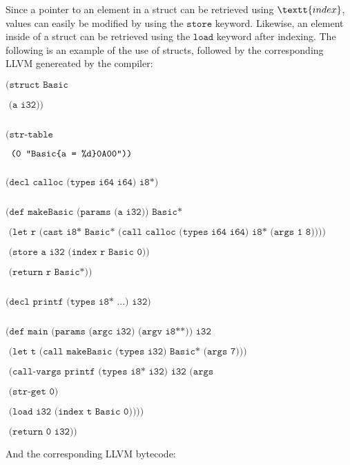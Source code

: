 \documentclass[journal=jacsat, manuscript=article]{achemso}
\begin{document}
Since a pointer to an element in a struct can be retrieved using $\textt{index}$, values can easily be
modified by using the $\texttt{store}$ keyword. Likewise, an element inside of a struct can be retrieved
using the $\texttt{load}$ keyword after indexing. The following is an example of the use of structs, followed
by the corresponding LLVM genereated by the compiler:

\footnotesize{ 
$\texttt{(struct Basic}$

$\texttt{  (a i32))}$

$\texttt{}$

$\texttt{(str-table}$

$\texttt{  (0 "Basic\{a = \%d\}\\0A\\00"))}$

$\texttt{}$

$\texttt{(decl calloc (types i64 i64) i8*)}$

$\texttt{}$

$\texttt{(def makeBasic (params (a i32)) Basic*}$

$\texttt{  (let r (cast i8* Basic* (call calloc (types i64 i64) i8* (args 1 8))))}$

$\texttt{  (store a i32 (index r Basic 0))}$

$\texttt{  (return r Basic*))}$

$\texttt{}$

$\texttt{(decl printf (types i8* ...) i32)}$

$\texttt{}$

$\texttt{(def main (params (argc i32) (argv i8**)) i32}$

$\texttt{  (let t (call makeBasic (types i32) Basic* (args 7)))}$

$\texttt{  (call-vargs printf (types i8* i32) i32 (args}$

$\texttt{    (str-get 0)}$

$\texttt{    (load i32 (index t Basic 0))))}$

$\texttt{  (return 0 i32))}$
}

\normalsize
And the corresponding LLVM bytecode:
\end{document}
